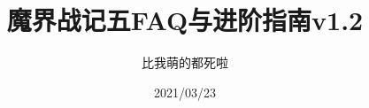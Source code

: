 


\title{魔界战记五FAQ与进阶指南v1.2}
\author{比我萌的都死啦}
\date{2021/03/23}

\maketitle


\newpage
\tableofcontents


% 









	












